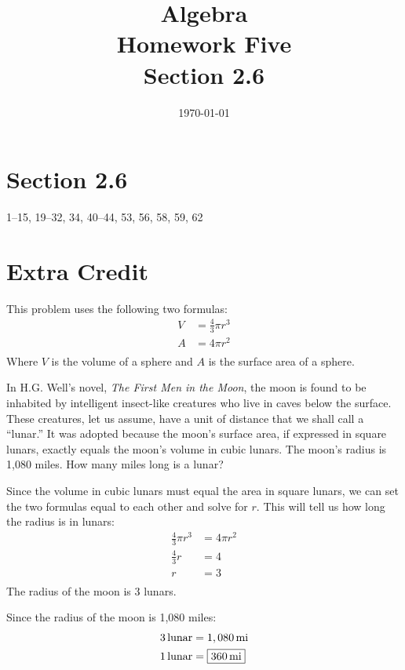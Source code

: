 \documentclass[letterpaper, landscape]{exam}
\title{Algebra \\ Homework Five \\ Section 2.6 }
\author{}
\date{\today}
\begin{document}
  \maketitle

 \section{Section 2.6}
  1--15, 19--32, 34, 40--44, 53, 56, 58, 59, 62

  \section{Extra Credit}

  This problem uses the following two formulas:
  \begin{align*}
    V & = \frac{4}{3} \pi r^3 \\
    A & = 4 \pi r^2 \\
  \end{align*}
  Where $V$ is the volume of a sphere and $A$ is the surface area of a sphere.

  In H.G. Well's novel, {\em The First Men in the Moon}, the moon is found
  to be inhabited by intelligent insect-like creatures who live in caves
  below the surface.  These creatures, let us assume, have a unit of
  distance that we shall call a ``lunar.''  It was adopted because the
  moon's surface area, if expressed in square lunars, exactly equals the
  moon's volume in cubic lunars.  The moon's radius is 1,080 miles.  How
  many miles long is a lunar?

  \begin{solution}
    Since the volume in cubic lunars must equal the area in square lunars,
    we can set the two formulas equal to each other and solve for $r$.
    This will tell us how long the radius is in lunars:
    \begin{align*}
      \frac{4}{3} \pi r^3 & = 4 \pi r^2 \\
      \frac{4}{3} r       & = 4 \\
      r                   & = 3 \\
    \end{align*}
    The radius of the moon is 3 lunars. 
    
    Since the radius of the moon is 1,080 miles:
    \begin{align*}
      \unit[3]{lunar} &= \unit[1,080]{mi} \\
      \unit[1]{lunar} &= \boxed{ \unit[360]{mi} } \\
    \end{align*}

  \end{solution}
\end{document}
